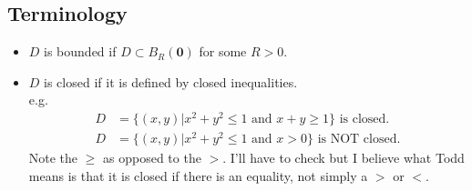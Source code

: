 \documentclass[11pt]{article}
\renewcommand{\vec}[1]{\mathbf{#1}}
\begin{document}
\subsection{Terminology}
\begin{itemize}
\item $D$ is bounded if $D \subset B_R(\vec{0})$ for some $R > 0$.
\item $D$ is closed if it is defined by closed inequalities.\\
e.g. \begin{align*}
D &= \{ (x, y) | x^2 + y^2 \leq 1 \text{ and } x + y \geq 1 \} \text{ is closed}. \\
D &= \{ (x, y) | x^2 + y^2 \leq 1 \text{ and } x > 0 \} \text{ is NOT closed}.
\end{align*}
Note the $\geq$ as opposed to the $>$. I'll have to check but I believe what Todd means is that it is closed if there is an equality, not simply a $>$ or $<$.
\end{itemize}
\end{document}
